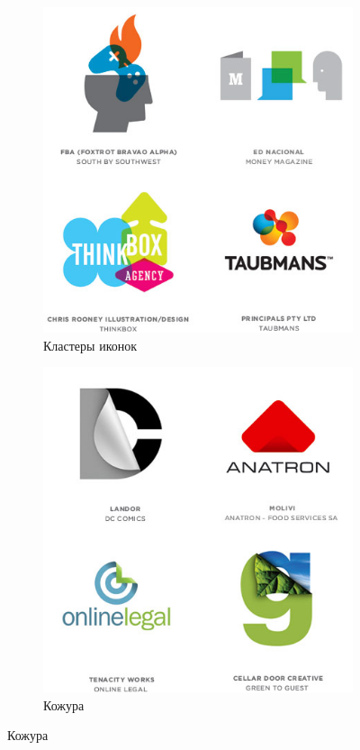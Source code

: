 \begin{figure}[h!]
  \ContinuedFloat
  \centering
  \begin{subfigure}{.45\textwidth}
    \centering
    \includegraphics[width=\linewidth]{images/supplement/logolounge/2012/Klasteri-ikonok.jpeg}
    \caption{Кластеры иконок}
    \label{fig:logolounge:2012:klasteri-ikonok}
  \end{subfigure}
  \hfill
  \centering
  \begin{subfigure}{.45\textwidth}
    \centering
    \includegraphics[width=\linewidth]{images/supplement/logolounge/2012/Kojura}
    \caption{Кожура}
    \label{fig:logolounge:2012:kojura}
  \end{subfigure}


\end{figure}
